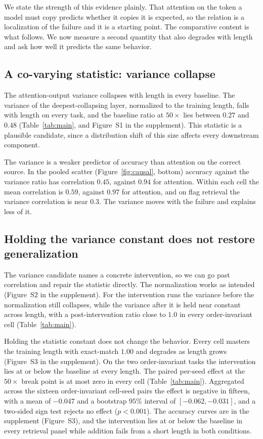 \documentclass[letterpaper]{article} %
\begin{document}
We state the strength of this evidence plainly.
That attention on the token a model must copy predicts whether it copies it is expected, so the relation
is a localization of the failure and it is a starting point.
The comparative content is what follows.
We now measure a second quantity that also degrades with length and ask how well it predicts the same
behavior.

\subsection{A co-varying statistic: variance collapse}
\label{sec:res-variance}

The attention-output variance collapses with length in every baseline.
The variance of the deepest-collapsing layer, normalized to the training length, falls with length on every
task, and the baseline ratio at $50\times$ lies between $0.27$ and $0.48$ (Table~\ref{tab:main}, and
Figure~S1 in the supplement).
This statistic is a plausible candidate, since a distribution shift of this size affects every downstream
component.

The variance is a weaker predictor of accuracy than attention on the correct source.
In the pooled scatter (Figure~\ref{fig:causal}, bottom) accuracy against the variance ratio has correlation
$0.45$, against $0.94$ for attention.
Within each cell the mean correlation is $0.59$, against $0.97$ for attention, and on flag retrieval the
variance correlation is near $0.3$.
The variance moves with the failure and explains less of it.

\subsection{Holding the variance constant does not restore generalization}
\label{sec:res-benefit}

The variance candidate names a concrete intervention, so we can go past correlation and repair the
statistic directly.
The normalization works as intended (Figure~S2 in the supplement).
For the intervention runs the variance before the normalization still collapses, while the variance after
it is held near constant across length, with a post-intervention ratio close to $1.0$ in every
order-invariant cell (Table~\ref{tab:main}).

Holding the statistic constant does not change the behavior.
Every cell masters the training length with exact-match $1.00$ and degrades as length grows
(Figure~S3 in the supplement).
On the two order-invariant tasks the intervention lies at or below the baseline at every length.
The paired per-seed effect at the $50\times$ break point is at most zero in every cell (Table~\ref{tab:main}).
Aggregated across the sixteen order-invariant cell-seed pairs the effect is negative in fifteen, with a
mean of $-0.047$ and a bootstrap $95\%$ interval of $[-0.062,-0.031]$, and a two-sided sign test rejects no
effect ($p<0.001$).
The accuracy curves are in the supplement (Figure~S3), and the intervention lies at or below the baseline in
every retrieval panel while addition fails from a short length in both conditions.
\end{document}
